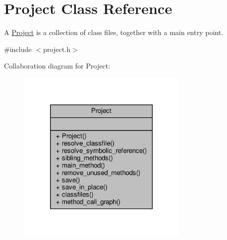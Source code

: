 \hypertarget{classProject}{}\section{Project Class Reference}
\label{classProject}


A \hyperlink{classProject}{Project} is a collection of class files, together with a main entry point.  




{\ttfamily \#include $<$project.\+h$>$}



Collaboration diagram for Project\+:\nopagebreak
\begin{figure}[H]
\begin{center}
\leavevmode
\includegraphics[width=233pt]{classProject__coll__graph}
\end{center}
\end{figure}

